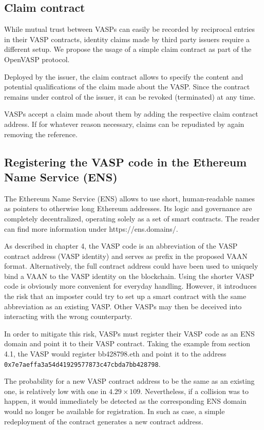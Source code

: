\documentclass{article}
\begin{document}
\subsection{Claim contract}

While mutual trust between VASPs can easily be recorded by reciprocal entries in their VASP contracts, identity claims made by third party issuers require a different setup. We propose the usage of a simple claim contract as part of the OpenVASP protocol.

Deployed by the issuer, the claim contract allows to specify the content and potential qualifications of the claim made about the VASP. Since the contract remains under control of the issuer, it can be revoked (terminated) at any time.

VASPs accept a claim made about them by adding the respective claim contract address. If for whatever reason necessary, claims can be repudiated by again removing the reference.

\subsection{Registering the VASP code in the Ethereum Name Service (ENS)}

The Ethereum Name Service (ENS) allows to use short, human-readable names as pointers to otherwise long Ethereum addresses. Its logic and governance are completely decentralized, operating solely as a set of smart contracts. The reader can find more information under https://ens.domains/.

As described in chapter 4, the VASP code is an abbreviation of the VASP contract address (VASP identity) and serves as prefix in the proposed VAAN format. Alternatively, the full contract address could have been used to uniquely bind a VAAN to the VASP identity on the blockchain. Using the shorter VASP code is obviously more convenient for everyday handling. However, it introduces the risk that an imposter could try to set up a smart contract with the same abbreviation as an existing VASP. Other VASPs may then be deceived into interacting with the wrong counterparty.

In order to mitigate this risk, VASPs must register their VASP code as an ENS domain and point it to their VASP contract. Taking the example from section 4.1, the VASP would register bb428798.eth and point it to the address \verb+0x7e7aeffa3a54d41929577873c47cbda7bb428798+.

The probability for a new VASP contract address to be the same as an existing one, is relatively low with one in $4.29 \times 109$. Nevertheless, if a collision was to happen, it would immediately be detected as the corresponding ENS domain would no longer be available for registration. In such as case, a simple redeployment of the contract generates a new contract address.
\end{document}
